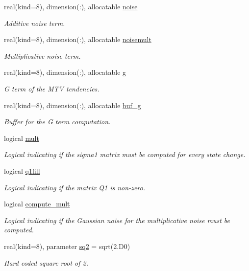 \begin{DoxyCompactItemize}
\item 
real(kind=8), dimension(\+:), allocatable \hyperlink{namespacerk2__mtv__integrator_a3171418fde58eb68937425899ecdc7af}{noise}
\begin{DoxyCompactList}\small\item\em Additive noise term. \end{DoxyCompactList}\item 
real(kind=8), dimension(\+:), allocatable \hyperlink{namespacerk2__mtv__integrator_a950fc0519ed9785d8126a54cfe3ecce9}{noisemult}
\begin{DoxyCompactList}\small\item\em Multiplicative noise term. \end{DoxyCompactList}\item 
real(kind=8), dimension(\+:), allocatable \hyperlink{namespacerk2__mtv__integrator_a011fd16734ea127ef794053331a8294e}{g}
\begin{DoxyCompactList}\small\item\em G term of the M\+TV tendencies. \end{DoxyCompactList}\item 
real(kind=8), dimension(\+:), allocatable \hyperlink{namespacerk2__mtv__integrator_a9db4772c6d66fba1a175dc7c493c8c6d}{buf\+\_\+g}
\begin{DoxyCompactList}\small\item\em Buffer for the G term computation. \end{DoxyCompactList}\item 
logical \hyperlink{namespacerk2__mtv__integrator_a08097c59dbd88f4ac0624dffb29fd6b1}{mult}
\begin{DoxyCompactList}\small\item\em Logical indicating if the sigma1 matrix must be computed for every state change. \end{DoxyCompactList}\item 
logical \hyperlink{namespacerk2__mtv__integrator_a9fbcf5a43f09dfa39f6ebcacf1b5504c}{q1fill}
\begin{DoxyCompactList}\small\item\em Logical indicating if the matrix Q1 is non-\/zero. \end{DoxyCompactList}\item 
logical \hyperlink{namespacerk2__mtv__integrator_ad56fffe540caff2644799cc5510e93c9}{compute\+\_\+mult}
\begin{DoxyCompactList}\small\item\em Logical indicating if the Gaussian noise for the multiplicative noise must be computed. \end{DoxyCompactList}\item 
real(kind=8), parameter \hyperlink{namespacerk2__mtv__integrator_afebf6d33084a6677b313e21740aa6b8b}{sq2} = sqrt(2.D0)
\begin{DoxyCompactList}\small\item\em Hard coded square root of 2. \end{DoxyCompactList}\end{DoxyCompactItemize}


